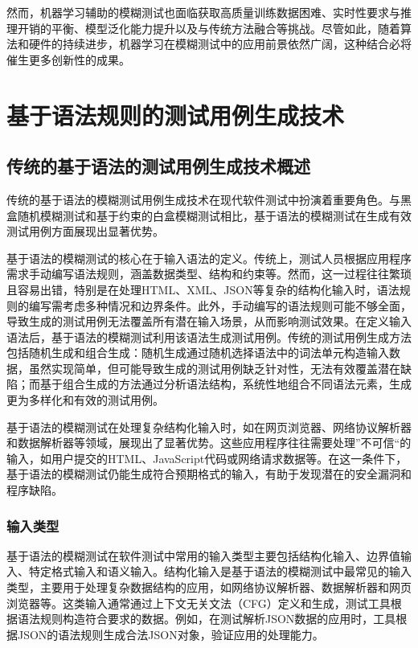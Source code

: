 \documentclass[10.5pt,compsoc]{CjC}
\theoremstyle{mystyle}
\begin{document}
然而，机器学习辅助的模糊测试也面临获取高质量训练数据困难、实时性要求与推理开销的平衡、模型泛化能力提升以及与传统方法融合等挑战。尽管如此，随着算法和硬件的持续进步，机器学习在模糊测试中的应用前景依然广阔，这种结合必将催生更多创新性的成果。

\vspace {10mm}

\section{基于语法规则的测试用例生成技术}

\subsection{传统的基于语法的测试用例生成技术概述}

传统的基于语法的模糊测试用例生成技术在现代软件测试中扮演着重要角色。与黑盒随机模糊测试和基于约束的白盒模糊测试相比，基于语法的模糊测试在生成有效测试用例方面展现出显著优势。

基于语法的模糊测试的核心在于输入语法的定义。传统上，测试人员根据应用程序需求手动编写语法规则，涵盖数据类型、结构和约束等。然而，这一过程往往繁琐且容易出错，特别是在处理HTML、XML、JSON等复杂的结构化输入时，语法规则的编写需考虑多种情况和边界条件。此外，手动编写的语法规则可能不够全面，导致生成的测试用例无法覆盖所有潜在输入场景，从而影响测试效果。在定义输入语法后，基于语法的模糊测试利用该语法生成测试用例。传统的测试用例生成方法包括随机生成和组合生成：随机生成通过随机选择语法中的词法单元构造输入数据，虽然实现简单，但可能导致生成的测试用例缺乏针对性，无法有效覆盖潜在缺陷；而基于组合生成的方法通过分析语法结构，系统性地组合不同语法元素，生成更为多样化和有效的测试用例。

基于语法的模糊测试在处理复杂结构化输入时，如在网页浏览器、网络协议解析器和数据解析器等领域，展现出了显著优势。这些应用程序往往需要处理”不可信“的输入，如用户提交的HTML、JavaScript代码或网络请求数据等。在这一条件下，基于语法的模糊测试仍能生成符合预期格式的输入，有助于发现潜在的安全漏洞和程序缺陷。

\vspace {10mm}
\subsubsection{输入类型}

基于语法的模糊测试在软件测试中常用的输入类型主要包括结构化输入、边界值输入、特定格式输入和语义输入。结构化输入是基于语法的模糊测试中最常见的输入类型，主要用于处理复杂数据结构的应用，如网络协议解析器、数据解析器和网页浏览器等。这类输入通常通过上下文无关文法（CFG）定义和生成，测试工具根据语法规则构造符合要求的数据。例如，在测试解析JSON数据的应用时，工具根据JSON的语法规则生成合法JSON对象，验证应用的处理能力。
\end{document}
